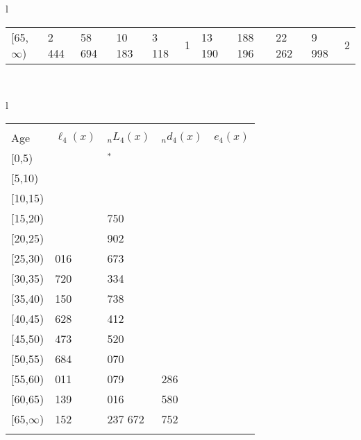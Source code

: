\documentclass[
]{article}
\begin{document}
\begin{table}
\begin{tabular}[t]{l}
\begin{tabular}
{}[65,$\infty$) & 2 444 & 58 694 & 10 183 & 3 118 & 1 & 13 190 & 188 196 & 22 262 & 9 998 & 2\\
\end{tabular}\\
\end{tabular}
\centering
\begin{tabular}[t]{l}
\hline
\begin{tabular}{>{\raggedright\arraybackslash}p{.43in}>{\raggedleft\arraybackslash}p{1.3in}>{\raggedleft\arraybackslash}p{1.3in}>{\raggedleft\arraybackslash}p{1.3in}>{\raggedleft\arraybackslash}p{1.3in}}
\toprule
\multicolumn{1}{c}{ } & \multicolumn{4}{c}{(4) Lost both} \\
\cmidrule(l{3pt}r{3pt}){2-5}
Age & $\ell_{4}(x)$ & ${}_nL_{4}(x)$ & ${}_nd_{4}(x)$ & $e_{4}(x)$\\
\midrule
{}[0,5) & 0 & 153$^{*}$ & 0 & 19\\
{}[5,10) & 105 & 601 & 0 & 19\\
{}[10,15) & 139 & 826 & 0 & 19\\
{}[15,20) & 233 & 1 750 & 1 & 19\\
{}[20,25) & 563 & 3 902 & 4 & 19\\
\addlinespace
{}[25,30) & 1 016 & 7 673 & 9 & 19\\
{}[30,35) & 1 720 & 15 334 & 22 & 19\\
{}[35,40) & 3 150 & 24 738 & 45 & 19\\
{}[40,45) & 5 628 & 45 412 & 106 & 19\\
{}[45,50) & 9 473 & 71 520 & 242 & 19\\
\addlinespace
{}[50,55) & 14 684 & 113 070 & 579 & 18\\
{}[55,60) & 25 011 & 162 079 & 1 286 & 18\\
{}[60,65) & 34 139 & 217 016 & 2 580 & 17\\
{}[65,$\infty$) & 47 152 & 1 237 672 & 65 752 & 15\\
\bottomrule
\multicolumn{5}{l}{\rule{0pt}{1em}\textsuperscript{*} Based on an estimated from SIPP with less than 10 respondents in the numerator.}\\
\end{tabular}\\
\end{tabular}
\end{table}
\end{document}

